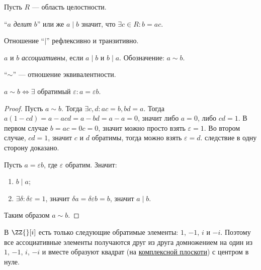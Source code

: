 \documentclass[12pt,a4paper]{article}
\begin{document}
    Пусть $R$ --- область целостности.

    \begin{definition}
        ``$a$ \emph{делит} $b$'' или же $a \mid b$ значит, что $\exists c \in R: b = ac$.
    \end{definition}

    \begin{statement}
        Отношение ``$\mid$'' рефлексивно и транзитивно.
    \end{statement}

    \begin{definition}
        $a$ и $b$ \emph{ассоциативны}, если $a \mid b$ и $b \mid a$. Обозначение: $a \sim b$.
    \end{definition}

    \begin{statement}
        ``$\sim$'' --- отношение эквивалентности.
    \end{statement}

    \begin{statement}
        $a \sim b \Leftrightarrow \exists \text{ обратимый } \varepsilon: a = \varepsilon b$.
    \end{statement}

    \begin{proof}
        Пусть $a \sim b$. Тогда $\exists c, d: ac = b, bd = a$. Тогда $a(1-cd) = a - acd = a - bd = a - a = 0$, значит либо $a = 0$, либо $cd = 1$. В первом случае $b = ac = 0c = 0$, значит можно просто взять $\varepsilon = 1$. Во втором случае, $cd = 1$, значит $c$ и $d$ обратимы, тогда можно взять $\varepsilon = d$. следствие в одну сторону доказано.

        Пусть $a = \varepsilon b$, где $\varepsilon$ обратим. Значит:
        \begin{enumerate}
            \item $b\mid a$;
            \item $\exists \delta: \delta\varepsilon = 1$, значит $\delta a = \delta \varepsilon b = b$, значит $a \mid b$.
        \end{enumerate}
        Таким образом $a \sim b$.
    \end{proof}

    \begin{example}
        В $\ZZ{}[i]$ есть только следующие обратимые элементы: $1$, $-1$, $i$ и $-i$. Поэтому все ассоциативные элементы получаются друг из друга домножением на один из $1$, $-1$, $i$, $-i$ и вместе образуют квадрат (на \href{https://ru.wikipedia.org/wiki/%D0%9A%D0%BE%D0%BC%D0%BF%D0%BB%D0%B5%D0%BA%D1%81%D0%BD%D0%B0%D1%8F_%D0%BF%D0%BB%D0%BE%D1%81%D0%BA%D0%BE%D1%81%D1%82%D1%8C}{комплексной плоскоти}) с центром в нуле.
    \end{example}
\end{document}
